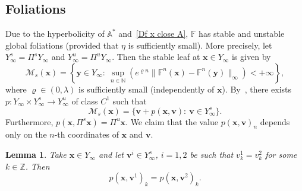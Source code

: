 \documentclass[reqno, a4paper, 10pt]{amsart}
\theoremstyle{plain}
\numberwithin{equation}{section}
\newtheorem{lemma}{Lemma}
\theoremstyle{remark}
\begin{document}
\subsection{Foliations}\label{sec: foliations}
Due to the hyperbolicity of $\mathbb A ^{\ast}$ and~\eqref{Df x close A}, $\mathbb F$ has stable and unstable global foliations (provided that $\eta$ is sufficiently small). More precisely, let $Y_\infty^s=\Pi^s Y_\infty$ and $Y_\infty^u=\Pi^u Y_\infty$. Then the stable leaf at $\mathbf x\in Y_\infty$ is given by 
\[
\mathcal M_s(\mathbf x)=\left \{\mathbf y\in Y_\infty: \ \sup_{n\in \mathbb N}(e^{\varrho n}\|\mathbb F^n(\mathbf x)-\mathbb F^n(\mathbf y)\|_\infty)<+\infty \right  \},
\]
where $\varrho \in (0, \lambda)$ is sufficiently small (independently of $\mathbf x$). By~\cite[Appendix]{DZZ},  there exists $p\colon Y_\infty \times Y_\infty^s \to Y_\infty^u$ of class $C^1$ such that 
\[
\mathcal M_s(\mathbf x)=\{\mathbf v+p(\mathbf x, \mathbf v): \ \mathbf v\in Y_\infty^s\}.
\]
Furthermore, $p(\mathbf x, \Pi^s \mathbf x)=\Pi^u \mathbf x$.
We claim that the value $p(\mathbf x, \mathbf v)_n$ depends only on the $n$-th coordinates of $\mathbf x$ and $\mathbf v$.
\begin{lemma}\label{lem: p x k depends only vk}
Take $\mathbf x\in Y_\infty$ and 
let $\mathbf v^i\in Y_\infty^s$, $i=1, 2$ be such that $v_k^1=v_k^2$ for some $k\in \mathbb Z$. Then
\[
p(\mathbf x, \mathbf v^1)_k=p(\mathbf x, \mathbf v^2)_k.
\]
\end{lemma}
\end{document}
